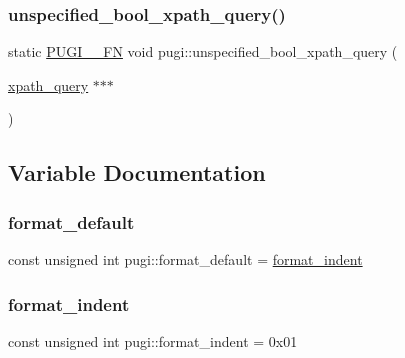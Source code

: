 \mbox{\label{namespacepugi_a41b925609dde7657664cf68c6506838b}} 
\subsubsection{\texorpdfstring{unspecified\+\_\+bool\+\_\+xpath\+\_\+query()}{unspecified\_bool\_xpath\_query()}}
{\footnotesize\ttfamily static \hyperlink{pugixml_8cpp_a82c335af3ca48cdb209c506bf8dd6ad2}{P\+U\+G\+I\+\_\+\+\_\+\+FN} void pugi\+::unspecified\+\_\+bool\+\_\+xpath\+\_\+query (\begin{DoxyParamCaption}\item[{\hyperlink{classpugi_1_1xpath__query}{xpath\+\_\+query} $\ast$$\ast$$\ast$}]{ }\end{DoxyParamCaption})\hspace{0.3cm}{\ttfamily [static]}}



\subsection{Variable Documentation}
\mbox{\label{namespacepugi_a325f48a35abbaeacdfd8b7fc9ed1713c}} 
\subsubsection{\texorpdfstring{format\+\_\+default}{format\_default}}
{\footnotesize\ttfamily const unsigned int pugi\+::format\+\_\+default = \hyperlink{namespacepugi_ace12e8dee65c5bae8ee42a64be7421d3}{format\+\_\+indent}}

\mbox{\label{namespacepugi_ace12e8dee65c5bae8ee42a64be7421d3}} 
\subsubsection{\texorpdfstring{format\+\_\+indent}{format\_indent}}
{\footnotesize\ttfamily const unsigned int pugi\+::format\+\_\+indent = 0x01}

